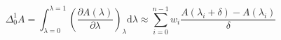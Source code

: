 


\[ \Delta_0^1 A = \int_{\lambda=0}^{\lambda=1} \left( \frac{\partial
    A(\lambda)}{\partial\lambda} \right)_\lambda \mathrm{d}\lambda
\approx \sum_{i=0}^{n-1} w_i \frac{A(\lambda_{i} + \delta) -
  A(\lambda_i)}{\delta} \]


